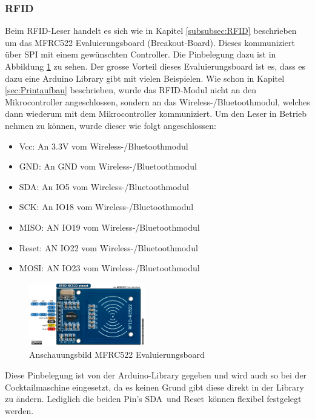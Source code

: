 \subsubsection{RFID}
\label{subsubsec:Inbetriebnahme_RFID}

Beim RFID-Leser handelt es sich wie in Kapitel \ref{subsubsec:RFID} beschrieben um das MFRC522 Evaluierungsboard (Breakout-Board). Dieses kommuniziert über SPI mit einem gewünschten Controller. Die Pinbelegung dazu ist in Abbildung \ref{fig:MFRC522} zu sehen. Der grosse Vorteil dieses Evaluierungsboard ist es, dass es dazu eine Arduino Library gibt mit vielen Beispielen. Wie schon in Kapitel \ref{sec:Printaufbau} beschrieben, wurde das RFID-Modul nicht an den Mikrocontroller angeschlossen, sondern an das Wireless-/Bluetoothmodul, welches dann wiederum mit dem Mikrocontroller kommuniziert. Um den Leser in Betrieb nehmen zu können, wurde dieser wie folgt angeschlossen:


\begin{itemize}
\item Vcc: An 3.3V vom Wireless-/Bluetoothmodul
\item GND: An GND vom Wireless-/Bluetoothmodul
\item SDA: An IO5 vom Wireless-/Bluetoothmodul
\item SCK: An IO18 vom Wireless-/Bluetoothmodul
\item MISO: AN IO19 vom Wireless-/Bluetoothmodul
\item Reset: AN IO22 vom Wireless-/Bluetoothmodul
\item MOSI: AN IO23 vom Wireless-/Bluetoothmodul
\end{itemize}

\begin{figure}[h!]
\center
\includegraphics[width = 0.45\textwidth]{graphics/MFRC522}
\caption{Anschauungsbild MFRC522 Evaluierungsboard \cite{nxp_bv_2010_antenna_2010}}
\label{fig:MFRC522}
\end{figure}

Diese Pinbelegung ist von der Arduino-Library gegeben und wird auch so bei der Cocktailmaschine eingesetzt, da es keinen Grund gibt diese direkt in der Library zu ändern. Lediglich die beiden Pin's \flqq SDA\frqq~und \flqq Reset\frqq~können flexibel festgelegt werden.

